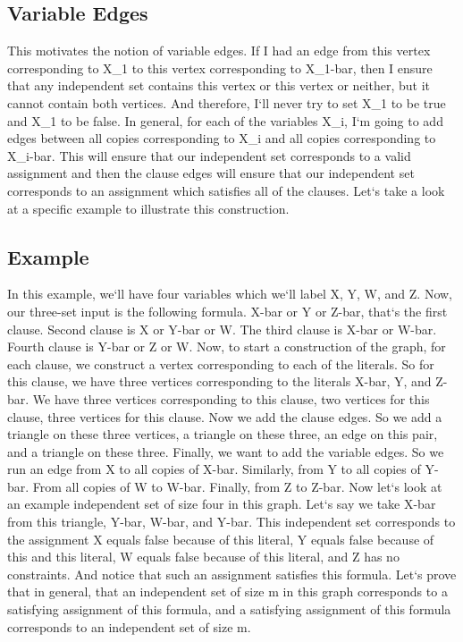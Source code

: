\subsection{Variable Edges}
This motivates the notion of variable edges.
If I had an edge from this vertex corresponding to X\_1 to this vertex corresponding to X\_1-bar, then I ensure that any independent set contains this vertex or this vertex or neither, but it cannot contain both vertices.
And therefore, I`ll never try to set X\_1 to be true and X\_1 to be false.
In general, for each of the variables X\_i, I`m going to add edges between all copies corresponding to X\_i and all copies corresponding to X\_i-bar.
This will ensure that our independent set corresponds to a valid assignment and then the clause edges will ensure that our independent set corresponds to an assignment which satisfies all of the clauses.
Let`s take a look at a specific example to illustrate this construction.

\subsection{Example}
In this example, we`ll have four variables which we`ll label X, Y, W, and Z\@.
Now, our three-set input is the following formula.
X-bar or Y or Z-bar, that`s the first clause.
Second clause is X or Y-bar or W\@.
The third clause is X-bar or W-bar.
Fourth clause is Y-bar or Z or W\@.
Now, to start a construction of the graph, for each clause, we construct a vertex corresponding to each of the literals.
So for this clause, we have three vertices corresponding to the literals X-bar, Y, and Z-bar.
We have three vertices corresponding to this clause, two vertices for this clause, three vertices for this clause.
Now we add the clause edges.
So we add a triangle on these three vertices, a triangle on these three, an edge on this pair, and a triangle on these three.
Finally, we want to add the variable edges.
So we run an edge from X to all copies of X-bar.
Similarly, from Y to all copies of Y-bar.
From all copies of W to W-bar.
Finally, from Z to Z-bar.
Now let`s look at an example independent set of size four in this graph.
Let`s say we take X-bar from this triangle, Y-bar, W-bar, and Y-bar.
This independent set corresponds to the assignment X equals false because of this literal, Y equals false because of this and this literal, W equals false because of this literal, and Z has no constraints.
And notice that such an assignment satisfies this formula.
Let`s prove that in general, that an independent set of size m in this graph corresponds to a satisfying assignment of this formula, and a satisfying assignment of this formula corresponds to an independent set of size m.

